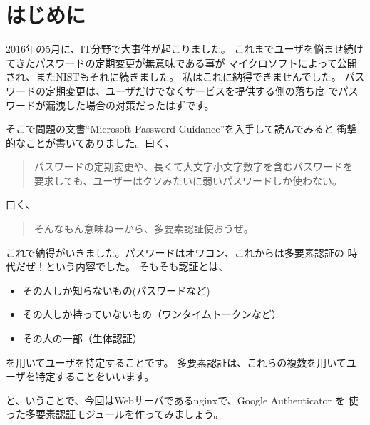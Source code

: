 \chapter*{はじめに}

2016年の5月に、IT分野で大事件が起こりました。
これまでユーザを悩ませ続けてきたパスワードの定期変更が無意味である事が
マイクロソフトによって公開され、またNISTもそれに続きました。
私はこれに納得できませんでした。
パスワードの定期変更は、ユーザだけでなくサービスを提供する側の落ち度
でパスワードが漏洩した場合の対策だったはずです。

そこで問題の文書``Microsoft Password Guidance''を入手して読んでみると
衝撃的なことが書いてありました。曰く、
\begin{quote}
パスワードの定期変更や、長くて大文字小文字数字を含むパスワードを
要求しても、ユーザーはクソみたいに弱いパスワードしか使わない。
\end{quote}
曰く、
\begin{quote}
そんなもん意味ねーから、多要素認証使おうぜ。
\end{quote}

これで納得がいきました。パスワードはオワコン、これからは多要素認証の
時代だぜ！という内容でした。
そもそも認証とは、
\begin{itemize}
	\item その人しか知らないもの(パスワードなど)
	\item その人しか持っていないもの（ワンタイムトークンなど）
	\item その人の一部（生体認証）
\end{itemize}
を用いてユーザを特定することです。
多要素認証は、これらの複数を用いてユーザを特定することをいいます。

と、いうことで、今回はWebサーバであるnginxで、Google Authenticator を
使った多要素認証モジュールを作ってみましょう。
